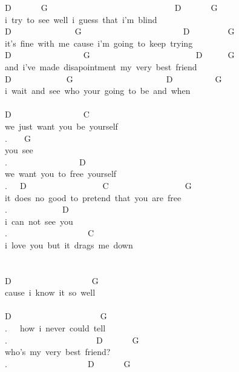 {D\ \ \ \ \ \ \ G\ \ \ \ \ \ \ \ \ \ \ \ \ \ \ \ \ \ \ \ \ \ \ \ \ \ \ \ \ \ D\ \ \ \ \ \ \ G\\
i\ try\ to\ see\ well\ i\ guess\ that\ i'm\ blind\\
D\ \ \ \ \ \ \ \ \ \ \ \ \ \ \ G\ \ \ \ \ \ \ \ \ \ \ \ \ \ \ \ \ \ \ \ \ \ \ \ D\ \ \ \ \ \ \ \ \ G\\
it's\ fine\ with\ me\ cause\ i'm\ going\ to\ keep\ trying\\
D\ \ \ \ \ \ \ \ \ \ \ \ \ \ \ \ \ G\ \ \ \ \ \ \ \ \ \ \ \ \ \ \ \ \ \ \ \ \ \ \ \ \ D\ \ \ \ \ \ G\\
and\ i've\ made\ disapointment\ my\ very\ best\ friend\\
D\ \ \ \ \ \ \ \ \ \ \ \ \ G\ \ \ \ \ \ \ \ \ \ \ \ \ \ \ \ \ \ \ \ \ \ D\ \ \ \ \ \ \ \ \ \ G\\
i\ wait\ and\ see\ who\ your\ going\ to\ be\ and\ when\\
\\
D\ \ \ \ \ \ \ \ \ \ \ \ \ \ \ \ \ C\\
we\ just\ want\ you\ be\ yourself\\
.\ \ \ \ G\\
you\ see\\
.\ \ \ \ \ \ \ \ \ \ \ \ \ \ \ \ \ D\\
we\ want\ you\ to\ free\ yourself\\
.\ \ \ D\ \ \ \ \ \ \ \ \ \ \ \ \ \ \ \ \ \ C\ \ \ \ \ \ \ \ \ \ \ \ \ \ \ \ \ \ G\\
it\ does\ no\ good\ to\ pretend\ that\ you\ are\ free\\
.\ \ \ \ \ \ \ \ \ \ \ \ \ D\\
i\ can\ not\ see\ you\\
.\ \ \ \ \ \ \ \ \ \ \ \ \ \ \ \ \ \ \ C\\
i\ love\ you\ but\ it\ drags\ me\ down\\
\\
\\
D\ \ \ \ \ \ \ \ \ \ \ \ \ \ \ \ \ \ \ G\\
cause\ i\ know\ it\ so\ well\\
\\
D\ \ \ \ \ \ \ \ \ \ \ \ \ \ \ \ \ \ \ \ \ G\\
.\ \ \ how\ i\ never\ could\ tell\\
.\ \ \ \ \ \ \ \ \ \ \ \ \ \ \ \ \ \ \ \ \ D\ \ \ \ \ \ \ G\\
who's\ my\ very\ best\ friend?\\
.\ \ \ \ \ \ \ \ \ \ \ \ \ \ \ \ \ \ \ D\ \ \ \ \ \ \ G\\
}

